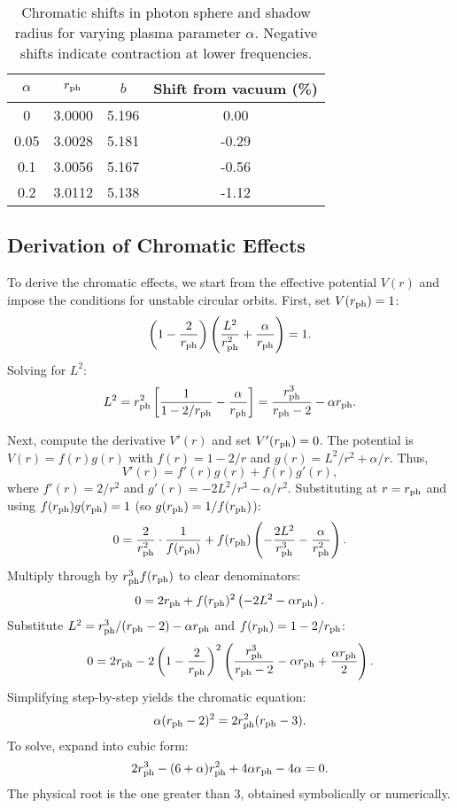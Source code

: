 \documentclass{article}
\begin{document}
\begin{table}[h]
\centering
\begin{tabular}{|c|c|c|c|}
\hline
$\alpha$ & $r_{\rm ph}$ & $b$ & Shift from vacuum (\%) \\
\hline
0 & 3.0000 & 5.196 & 0.00 \\
0.05 & 3.0028 & 5.181 & -0.29 \\
0.1 & 3.0056 & 5.167 & -0.56 \\
0.2 & 3.0112 & 5.138 & -1.12 \\
\hline
\end{tabular}
\caption{Chromatic shifts in photon sphere and shadow radius for varying plasma parameter $\alpha$. Negative shifts indicate contraction at lower frequencies.}
\label{tab:chromatic-shifts}
\end{table}

\subsection{Derivation of Chromatic Effects}

To derive the chromatic effects, we start from the effective potential $V(r)$ and impose the conditions for unstable circular orbits. First, set $V(r_{\rm ph}) = 1$:
\[
\left(1 - \frac{2}{r_{\rm ph}}\right) \left( \frac{L^2}{r_{\rm ph}^2} + \frac{\alpha}{r_{\rm ph}} \right) = 1.
\]
Solving for $L^2$:
\[
L^2 = r_{\rm ph}^2 \left[ \frac{1}{1 - 2/r_{\rm ph}} - \frac{\alpha}{r_{\rm ph}} \right] = \frac{r_{\rm ph}^3}{r_{\rm ph} - 2} - \alpha r_{\rm ph}.
\]

Next, compute the derivative $V'(r)$ and set $V'(r_{\rm ph}) = 0$. The potential is $V(r) = f(r) g(r)$ with $f(r) = 1 - 2/r$ and $g(r) = L^2 / r^2 + \alpha / r$. Thus,
\[
V'(r) = f'(r) g(r) + f(r) g'(r),
\]
where $f'(r) = 2/r^2$ and $g'(r) = -2 L^2 / r^3 - \alpha / r^2$. Substituting at $r = r_{\rm ph}$ and using $f(r_{\rm ph}) g(r_{\rm ph}) = 1$ (so $g(r_{\rm ph}) = 1/f(r_{\rm ph})$):
\[
0 = \frac{2}{r_{\rm ph}^2} \cdot \frac{1}{f(r_{\rm ph})} + f(r_{\rm ph}) \left( -\frac{2 L^2}{r_{\rm ph}^3} - \frac{\alpha}{r_{\rm ph}^2} \right).
\]
Multiply through by $r_{\rm ph}^3 f(r_{\rm ph})$ to clear denominators:
\[
0 = 2 r_{\rm ph} + f(r_{\rm ph})^2 \left( -2 L^2 - \alpha r_{\rm ph} \right).
\]
Substitute $L^2 = r_{\rm ph}^3 / (r_{\rm ph} - 2) - \alpha r_{\rm ph}$ and $f(r_{\rm ph}) = 1 - 2/r_{\rm ph}$:
\[
0 = 2 r_{\rm ph} - 2 \left(1 - \frac{2}{r_{\rm ph}}\right)^2 \left( \frac{r_{\rm ph}^3}{r_{\rm ph} - 2} - \alpha r_{\rm ph} + \frac{\alpha r_{\rm ph}}{2} \right).
\]
Simplifying step-by-step yields the chromatic equation:
\[
\alpha (r_{\rm ph} - 2)^2 = 2 r_{\rm ph}^2 (r_{\rm ph} - 3).
\]
To solve, expand into cubic form:
\[
2 r_{\rm ph}^3 - (6 + \alpha) r_{\rm ph}^2 + 4 \alpha r_{\rm ph} - 4 \alpha = 0.
\]
The physical root is the one greater than 3, obtained symbolically or numerically.
\end{document}
